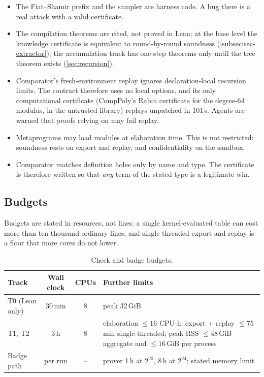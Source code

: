 \begin{itemize}[nosep]
  convention outside the contract (\cref{subsec:proto-relation}).
\item The Fiat--Shamir prefix and the sampler are harness code. A bug there is a real attack with a
  valid certificate.
\item The compilation theorems are cited, not proved in Lean; at the base level the knowledge
  certificate is equivalent to round-by-round soundness (\cref{subsec:sec-extractor}); the
  accumulation track has one-step theorems only until the tree theorem exists (\cref{sec:recursion}).
\item Comparator's fresh-environment replay ignores declaration-local recursion limits. The
  contract therefore uses no local options, and its only computational certificate (CompPoly's
  Rabin certificate for the degree-64 modulus, in the untrusted library) replays unpatched in
  101\,s. Agents are warned that proofs relying on  may fail replay.
\item Metaprograms may load modules at elaboration time. This is not restricted: soundness rests
  on export and replay, and confidentiality on the sandbox.
\item Comparator matches definition holes only by name and type. The certificate is therefore
  written so that \emph{any} term of the stated type is a legitimate win.
\end{itemize}

\subsection{Budgets}\label{subsec:arch-budgets}

Budgets are stated in resources, not lines: a single kernel-evaluated  table can cost
more than ten thousand ordinary lines, and single-threaded export and replay is a floor that more
cores do not lower.

\begin{table}[h]
\centering\small
\begin{tabularx}{\linewidth}{@{}lccX@{}}
\toprule
Track & Wall clock & CPUs & Further limits \\
\midrule
T0 (Lean only) & 30\,min & 8 & peak 32\,GiB \\
T1, T2 & 3\,h & 8 & elaboration $\le 16$ CPU-h; export + replay $\le 75$\,min single-threaded; peak RSS $\le 48$\,GiB aggregate and $\le 16$\,GiB per process \\
Badge path & per run & -- & prover 1\,h at $2^{20}$, 8\,h at $2^{24}$; stated memory limit \\
\bottomrule
\end{tabularx}
\caption{Check and badge budgets.}
\label{tab:arch-budgets}
\end{table}

